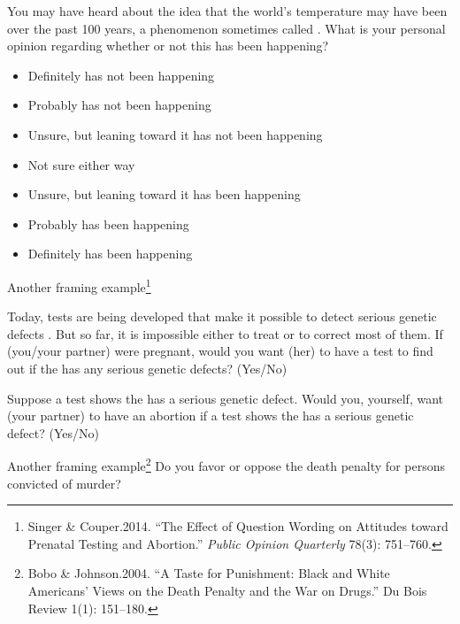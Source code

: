 \documentclass[
  ignorenonframetext,
]{beamer}
\begin{document}
\begin{frame}{}
\protect\hypertarget{section-1}{}
\small

You may have heard about the idea that the world's temperature may have
been \textbf{} over the past 100
years, a phenomenon sometimes called
\textbf{}. What is your
personal opinion regarding whether or not this has been happening?

\begin{itemize}\itemsep-0.25em\footnotesize
    \item Definitely has not been happening
    \item Probably has not been happening
    \item Unsure, but leaning toward it has not been happening
    \item Not sure either way
    \item Unsure, but leaning toward it has been happening
    \item Probably has been happening
    \item Definitely has been happening
    \end{itemize}
\end{frame}

\begin{frame}{\normalsize Another framing
example\footnote{Singer \& Couper.2014. ``The Effect of Question Wording on Attitudes toward Prenatal Testing and Abortion.'' \textit{Public Opinion Quarterly} 78(3): 751--760.}}
\protect\hypertarget{another-framing-example}{}
\footnotesize

Today, tests are being developed that make it possible to detect serious
genetic defects
\textbf{}.
But so far, it is impossible either to treat or to correct most of them.
If (you/your partner) were pregnant, would you want (her) to have a test
to find out if the \textbf{} has any
serious genetic defects? (Yes/No)

\vspace{0.5em}

Suppose a test shows the \textbf{} has a
serious genetic defect. Would you, yourself, want (your partner) to have
an abortion if a test shows the \textbf{}
has a serious genetic defect? (Yes/No)
\end{frame}

\begin{frame}{\normalsize Another framing
example\footnote{Bobo \& Johnson.2004. ``A Taste for Punishment: Black and White Americans' Views on the Death Penalty and the War on Drugs.'' Du Bois Review 1(1): 151--180.}}
\protect\hypertarget{another-framing-example-1}{}
Do
you favor or oppose the death penalty for persons convicted of murder?
\end{frame}
\end{document}
